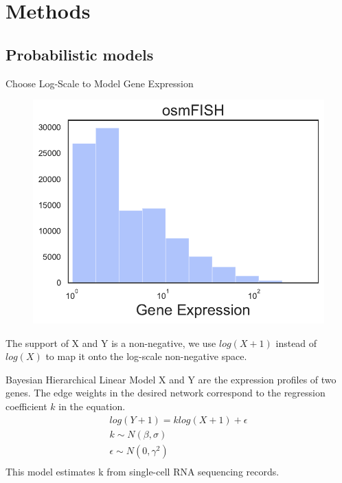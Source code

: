 \documentclass[handout,t]{beamer}
\begin{document}

\section{Methods}

\subsection{Probabilistic models}

\begin{frame}{Choose Log-Scale to Model Gene Expression}
\vspace{-0.5cm}
\begin{figure}
\includegraphics[width=0.7\columnwidth]{../figure/dist/osmFISH.pdf}
\end{figure}
\vspace{-0.1cm}
The support of X and Y is a non-negative, we use $log(X+1)$ instead of $log(X)$ to map it onto the log-scale non-negative space.
\end{frame}


\begin{frame}{Bayesian Hierarchical Linear Model}
X and Y are the expression profiles of two genes. The edge weights in the desired network correspond to the regression coefficient $k$ in the equation.
\begin{equation}
    \begin{array}{ll}
            log(Y+1) = k log(X+1) +\epsilon\\
            k \sim N(\beta, \sigma)\\
            \epsilon \sim N(0, \gamma^2)\\
    \end{array}
\end{equation}
This model estimates k from single-cell RNA sequencing records.
\end{frame}
\end{document}
